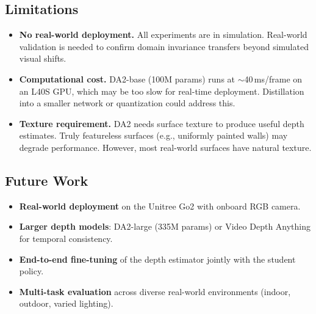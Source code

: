 \documentclass[10pt,twocolumn]{article}
\begin{document}
\subsection{Limitations}

\begin{itemize}
  \item \textbf{No real-world deployment.}  All experiments are in
    simulation.  Real-world validation is needed to confirm
    domain invariance transfers beyond simulated visual shifts.
  \item \textbf{Computational cost.}  DA2-base (100M params) runs
    at $\sim$40\,ms/frame on an L40S GPU, which may be too slow for
    real-time deployment.  Distillation into a smaller network or
    quantization could address this.
  \item \textbf{Texture requirement.}  DA2 needs surface texture to
    produce useful depth estimates.  Truly featureless surfaces (e.g.,
    uniformly painted walls) may degrade performance.  However, most
    real-world surfaces have natural texture.
\end{itemize}

\subsection{Future Work}

\begin{itemize}
  \item \textbf{Real-world deployment} on the Unitree Go2 with
    onboard RGB camera.
  \item \textbf{Larger depth models}: DA2-large (335M params) or
    Video Depth Anything for temporal consistency.
  \item \textbf{End-to-end fine-tuning} of the depth estimator
    jointly with the student policy.
  \item \textbf{Multi-task evaluation} across diverse real-world
    environments (indoor, outdoor, varied lighting).
\end{itemize}




\end{document}

